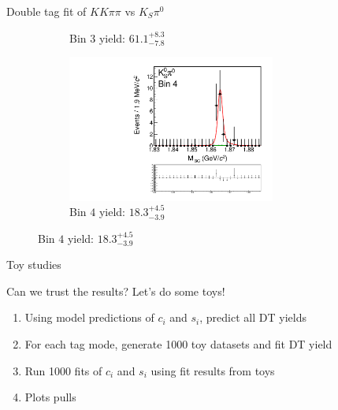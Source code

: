 \documentclass{beamer}
\begin{document}
\begin{frame}{Double tag fit of $KK\pi\pi$ vs $K_S\pi^0$}
\begin{figure}
\begin{subfigure}{0.5\textwidth}
      \caption{Bin $3$ yield: $61.1_{-7.8}^{+8.3}$}
    \end{subfigure}%
    \begin{subfigure}{0.5\textwidth}
      \centering
      \includegraphics[width=0.75\textwidth,trim={0 5cm 0 0},clip=true]{Plots/DoubleTagYield_DoubleTag_CP_KKpipi_vs_KSpi0_SignalBin4.pdf}
      \caption{Bin $4$ yield: $18.3_{-3.9}^{+4.5}$}
    \end{subfigure}
  \end{figure}
\end{frame}

\begin{frame}{Toy studies}
  \begin{center}
    \Large{Can we trust the results? Let's do some toys!}
  \end{center}
  \begin{enumerate}
    \setlength\itemsep{1.0em}
    \item{Using model predictions of $c_i$ and $s_i$, predict all DT yields}
    \item{For each tag mode, generate 1000 toy datasets and fit DT yield}
    \item{Run 1000 fits of $c_i$ and $s_i$ using fit results from toys}
    \item{Plots pulls}
  \end{enumerate}
\end{frame}
\end{document}
